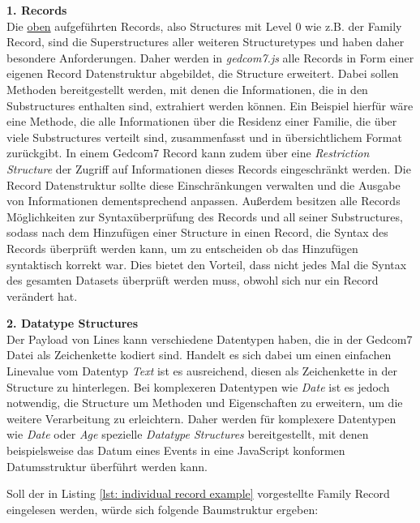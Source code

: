 \vspace{1em}
\textbf{1. Records} \vspace{0.5em} \\
Die \hyperref[liste records]{oben} aufgeführten Records, also Structures mit Level 0 wie z.B. der Family Record, sind die Superstructures aller weiteren Structuretypes und haben daher besondere Anforderungen. Daher werden in \textit{gedcom7.js} alle Records in Form einer eigenen Record Datenstruktur abgebildet, die Structure erweitert. Dabei sollen Methoden bereitgestellt werden, mit denen die Informationen, die in den Substructures enthalten sind, extrahiert werden können. Ein Beispiel hierfür wäre eine Methode, die alle Informationen über die Residenz einer Familie, die über viele Substructures verteilt sind, zusammenfasst und in übersichtlichem Format zurückgibt. In einem Gedcom7 Record kann zudem über eine \textit{Restriction Structure} der Zugriff auf Informationen dieses Records eingeschränkt werden. Die Record Datenstruktur sollte diese Einschränkungen verwalten und die Ausgabe von Informationen dementsprechend anpassen. Außerdem besitzen alle Records Möglichkeiten zur Syntaxüberprüfung des Records und all seiner Substructures, sodass nach dem Hinzufügen einer Structure in einen Record, die Syntax des Records überprüft werden kann, um zu entscheiden ob das Hinzufügen syntaktisch korrekt war. Dies bietet den Vorteil, dass nicht jedes Mal die Syntax des gesamten Datasets überprüft werden muss, obwohl sich nur ein Record verändert hat.

\vspace{1em}
\textbf{2. Datatype Structures} \vspace{0.5em} \\
Der Payload von Lines kann verschiedene Datentypen haben, die in der Gedcom7 Datei als Zeichenkette kodiert sind. Handelt es sich dabei um einen einfachen Linevalue vom Datentyp \textit{Text} ist es ausreichend, diesen als Zeichenkette in der Structure zu hinterlegen. Bei komplexeren Datentypen wie \textit{Date} ist es jedoch notwendig, die Structure um Methoden und Eigenschaften zu erweitern, um die weitere Verarbeitung zu erleichtern. Daher werden für komplexere Datentypen wie \textit{Date} oder \textit{Age} spezielle \textit{Datatype Structures} bereitgestellt, mit denen beispielsweise das Datum eines Events in eine JavaScript konformen Datumsstruktur überführt werden kann.

Soll der in Listing \ref{lst: individual record example} vorgestellte Family Record eingelesen werden, würde sich folgende Baumstruktur ergeben: 
\label{fig: Baumstruktur Family Record}

